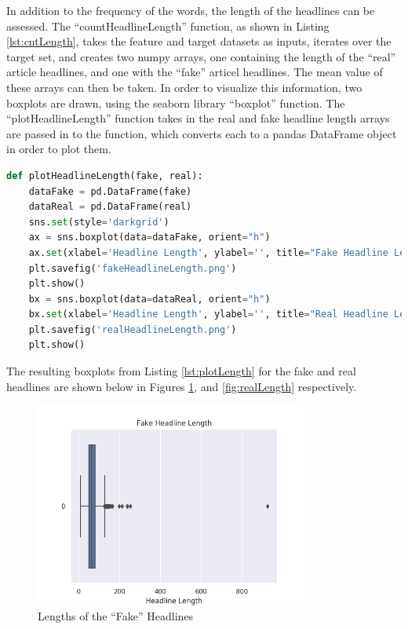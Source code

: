 \par In addition to the frequency of the words, the length of the headlines can
be assessed. The ``countHeadlineLength'' function, as shown in Listing
\ref{lst:cntLength}, takes the feature and target datasets as inputs, iterates
over the target set, and creates two numpy arrays, one containing the length of
the ``real'' article headlines, and one with the ``fake'' articel headlines. The
mean value of these arrays can then be taken. In order to visualize this
information, two boxplots are drawn, using the seaborn library ``boxplot''
function. The ``plotHeadlineLength'' function takes in the real and fake
headline length arrays are passed in to the function, which converts each to a
pandas DataFrame object in order to plot them.

\begin{lstlisting}[language=Python, caption={``plotHeadlineLength'' Function},
label={lst:plotLength}]
def plotHeadlineLength(fake, real):
    dataFake = pd.DataFrame(fake)
    dataReal = pd.DataFrame(real)
    sns.set(style='darkgrid')
    ax = sns.boxplot(data=dataFake, orient="h")
    ax.set(xlabel='Headline Length', ylabel='', title="Fake Headline Length")
    plt.savefig('fakeHeadlineLength.png')
    plt.show()
    bx = sns.boxplot(data=dataReal, orient="h")
    bx.set(xlabel='Headline Length', ylabel='', title="Real Headline Length")
    plt.savefig('realHeadlineLength.png')
    plt.show()
\end{lstlisting}

The resulting boxplots from Listing \ref{lst:plotLength} for the fake and real
headlines are shown below in Figures \ref{fig:fakeLength}, and
\ref{fig:realLength} respectively.

\begin{figure}[H]
	\centering
	\includegraphics[width=0.8\textwidth]{images/fakeHeadlineLength}
	\caption{Lengths of the ``Fake'' Headlines}
	\label{fig:fakeLength}
\end{figure}

